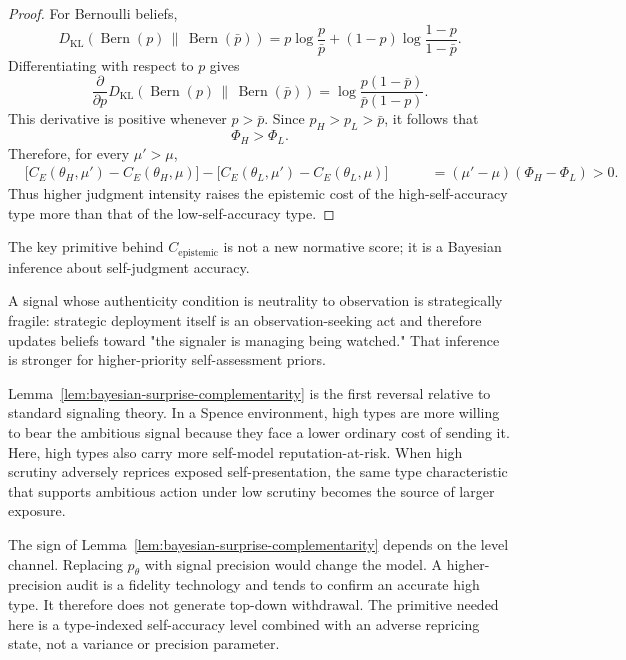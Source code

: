 \begin{proof}
For Bernoulli beliefs,
\[
D_{\mathrm{KL}}
\left(
\operatorname{Bern}(p)
\,\middle\|\,
\operatorname{Bern}(\bar p)
\right)
=
p\log\frac{p}{\bar p}
+
(1-p)\log\frac{1-p}{1-\bar p}.
\]
Differentiating with respect to $p$ gives
\[
\frac{\partial}{\partial p}
D_{\mathrm{KL}}
\left(
\operatorname{Bern}(p)
\,\middle\|\,
\operatorname{Bern}(\bar p)
\right)
=
\log\frac{p(1-\bar p)}{\bar p(1-p)}.
\]
This derivative is positive whenever $p>\bar p$. Since $p_H>p_L>\bar p$, it follows that
\[
\Phi_H>\Phi_L.
\]
Therefore, for every $\mu'>\mu$,
\[
\begin{aligned}
&\big[C_E(\theta_H,\mu')-C_E(\theta_H,\mu)\big]
-\big[C_E(\theta_L,\mu')-C_E(\theta_L,\mu)\big]\
&\qquad
=(\mu'-\mu)(\Phi_H-\Phi_L)>0.
\end{aligned}
\]
Thus higher judgment intensity raises the epistemic cost of the high-self-accuracy type more than that of the low-self-accuracy type.
\end{proof}

\begin{remark}
The key primitive behind $C_{\text{epistemic}}$ is not a new normative score; it is a Bayesian inference about self-judgment accuracy.

A signal whose authenticity condition is neutrality to observation is strategically fragile: strategic deployment itself is an observation-seeking act and therefore updates beliefs toward "the signaler is managing being watched." That inference is stronger for higher-priority self-assessment priors.
\end{remark}

Lemma~\ref{lem:bayesian-surprise-complementarity} is the first reversal relative to standard signaling theory. In a Spence environment, high types are more willing to bear the ambitious signal because they face a lower ordinary cost of sending it. Here, high types also carry more self-model reputation-at-risk. When high scrutiny adversely reprices exposed self-presentation, the same type characteristic that supports ambitious action under low scrutiny becomes the source of larger exposure.

\begin{remark}
The sign of Lemma~\ref{lem:bayesian-surprise-complementarity} depends on the level channel. Replacing $p_\theta$ with signal precision would change the model. A higher-precision audit is a fidelity technology and tends to confirm an accurate high type. It therefore does not generate top-down withdrawal. The primitive needed here is a type-indexed self-accuracy level combined with an adverse repricing state, not a variance or precision parameter.
\end{remark}


